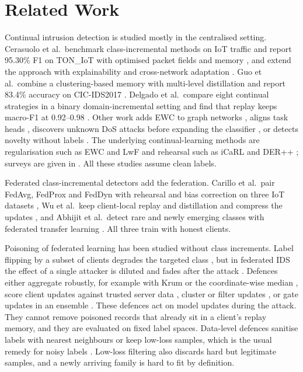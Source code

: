 \documentclass[pdflatex,sn-mathphys-num]{sn-jnl}
\theoremstyle{thmstyleone}
\theoremstyle{thmstylethree}
\begin{document}
\section{Related Work}\label{sec:related}
Continual intrusion detection is studied mostly in the centralised setting. Cerasuolo et al.\ benchmark class-incremental methods on IoT traffic and report 95.30\% F1 on TON\_IoT with optimised packet fields and memory \cite{cerasuolo}, and extend the approach with explainability and cross-network adaptation \cite{cerasuolo2}. Guo et al.\ combine a clustering-based memory with multi-level distillation and report 83.4\% accuracy on CIC-IDS2017 \cite{guo}. Delgado et al.\ compare eight continual strategies in a binary domain-incremental setting and find that replay keeps macro-F1 at 0.92--0.98 \cite{delgado}. Other work adds EWC to graph networks \cite{elgnn}, aligns task heads \cite{ctwa}, discovers unknown DoS attacks before expanding the classifier \cite{ge}, or detects novelty without labels \cite{cnd}. The underlying continual-learning methods are regularisation such as EWC and LwF \cite{ewc,lwf} and rehearsal such as iCaRL and DER++ \cite{icarl,der}; surveys are given in \cite{delange}. All these studies assume clean labels.

Federated class-incremental detectors add the federation. Carillo et al.\ pair FedAvg, FedProx and FedDyn with rehearsal and bias correction on three IoT datasets \cite{carillo}, Wu et al.\ keep client-local replay and distillation and compress the updates \cite{wu}, and Abhijit et al.\ detect rare and newly emerging classes with federated transfer learning \cite{rare}. All three train with honest clients.

Poisoning of federated learning has been studied without class increments. Label flipping by a subset of clients degrades the targeted class \cite{tolpegin}, but in federated IDS the effect of a single attacker is diluted and fades after the attack \cite{lavaur}. Defences either aggregate robustly, for example with Krum or the coordinate-wise median \cite{krum,yin}, score client updates against trusted server data \cite{fltrust,wei}, cluster or filter updates \cite{amm,flzt,lfighter}, or gate updates in an ensemble \cite{prasad}. These defences act on model updates during the attack. They cannot remove poisoned records that already sit in a client's replay memory, and they are evaluated on fixed label spaces. Data-level defences sanitise labels with nearest neighbours \cite{paudice} or keep low-loss samples, which is the usual remedy for noisy labels \cite{itlm,coteach,mentornet,song}. Low-loss filtering also discards hard but legitimate samples, and a newly arriving family is hard to fit by definition.
\end{document}
